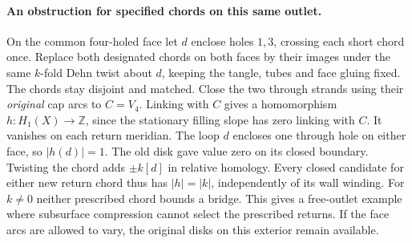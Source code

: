 \documentclass[11pt,letterpaper]{article}
\numberwithin{equation}{section}
\theoremstyle{remark}
\begin{document}
\paragraph{An obstruction for specified chords on this same outlet.}
On the common four-holed face let \(d\) enclose holes \(1,3\),
crossing each short chord once. Replace both designated chords on
both faces by their images under the same \(k\)-fold Dehn twist about
\(d\), keeping the tangle, tubes and face gluing fixed. The chords
stay disjoint and matched. Close the two through strands using their
\emph{original} cap arcs to \(C=V_4\). Linking with \(C\) gives a
homomorphism \(h:H_1(X)\to\mathbb Z\), since the stationary filling
slope has zero linking with \(C\). It vanishes on each return meridian.
The loop \(d\) encloses one through hole on either face, so
\(\lvert h(d)\rvert=1\). The old disk gave value zero on its
closed boundary. Twisting the chord adds \(\pm k[d]\) in relative
homology. Every closed candidate for either new return chord thus
has \(\lvert h\rvert=\lvert k\rvert\), independently of its wall
winding. For \(k\ne0\) neither prescribed chord bounds a bridge.
This gives a free-outlet example where subsurface compression
cannot select the prescribed returns. If the face arcs are allowed
to vary, the original disks on this exterior remain available.
\end{document}
